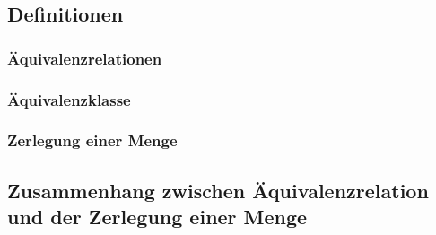\subsection{Definitionen}

\subsubsection{Äquivalenzrelationen}
\subsubsection{Äquivalenzklasse}
\subsubsection{Zerlegung einer Menge}
\subsection{Zusammenhang zwischen Äquivalenzrelation und der Zerlegung einer Menge}
